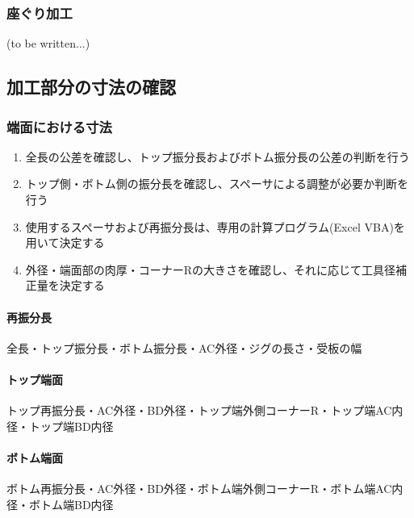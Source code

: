 \subsubsection{座ぐり加工\TBW}
(to be written...)


\subsection{加工部分の寸法の確認}

\subsubsection{端面における寸法}
\begin{enumerate}
\item {}全長の公差を確認し、トップ振分長およびボトム振分長の公差の判断を行う
\item トップ側・ボトム側の振分長を確認し、スペーサによる調整が必要か判断を行う
\item 使用するスペーサおよび再振分長は、専用の計算プログラム(Excel VBA)を用いて決定する
\item 外径・端面部の肉厚・コーナーRの大きさを確認し、それに応じて工具径補正量を決定する
\end{enumerate}
\begin{Tabbox}[title={必要な図面上のパラメータ}]\small
\paragraph*{再振分長}
全長・トップ振分長・ボトム振分長・AC外径・ジグの長さ・受板の幅
\tcbline*
\paragraph*{トップ端面}
トップ再振分長・AC外径・BD外径・トップ端外側コーナーR・トップ端AC内径・トップ端BD内径
\tcbline*
\paragraph*{ボトム端面}
ボトム再振分長・AC外径・BD外径・ボトム端外側コーナーR・ボトム端AC内径・ボトム端BD内径
\end{Tabbox}

